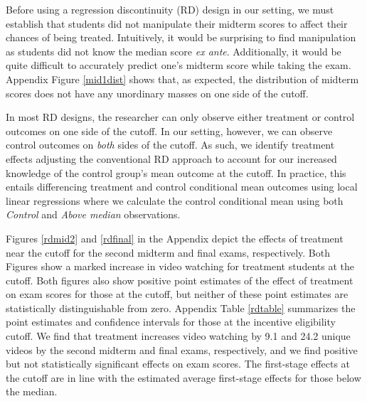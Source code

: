 \documentclass[12pt]{article}
\begin{document}
Before using a regression discontinuity (RD) design in our setting, we must establish that students did not manipulate their midterm scores to affect their chances of being treated. Intuitively, it would be surprising to find manipulation as students did not know the median score \textit{ex ante}. Additionally, it would be quite difficult to accurately predict one's midterm score while taking the exam. Appendix Figure \ref{mid1dist} shows that, as expected, the distribution of midterm scores does not have any unordinary masses on one side of the cutoff.

In most RD designs, the researcher can only observe either treatment or control outcomes on one side of the cutoff. In our setting, however, we can observe control outcomes on \textit{both} sides of the cutoff. As such, we identify treatment effects adjusting the conventional RD approach to account for our increased knowledge of the control group's mean outcome at the cutoff. In practice, this entails differencing treatment and control conditional mean outcomes using local linear regressions where we calculate the control conditional mean using both \textit{Control} and \textit{Above median} observations.

Figures \ref{rdmid2} and \ref{rdfinal} in the Appendix depict the effects of treatment near the cutoff for the second midterm and final exams, respectively. Both Figures show a marked increase in video watching for treatment students at the cutoff. Both figures also show positive point estimates of the effect of treatment on exam scores for those at the cutoff, but neither of these point estimates are statistically distinguishable from zero. Appendix Table \ref{rdtable} summarizes the point estimates and confidence intervals for those at the incentive eligibility cutoff. We find that treatment increases video watching by 9.1 and 24.2 unique videos by the second midterm and final exams, respectively, and we find positive but not statistically significant effects on exam scores. The first-stage effects at the cutoff are in line with the estimated average first-stage effects for those below the median.
\end{document}
